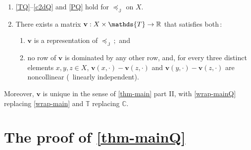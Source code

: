 \documentclass[12pt,a4paper,twoside]{article}
\newcommand{\gsii}{$\textup{GS03}$}
\newcommand{\preceqb}{\mathbin{\preceq}}
\newcommand{\countof}{\mathbin{\#}\hskip1pt}
\newcommand{\ext}{\mathrel{\mc R}}
\newcommand{\sext}{\mathrel{\mc P}}
\newcommand{\next}{\mathrel{\mc I}}
\newcommand{\sextb}{\mathbin{\mc P}}
\newcommand{\mbbc}{{\mathds C}}
\newcommand{\mbbt}{{\mathds {T}}}
\newcommand{\mbbj}{\mathds J}
\newcommand{\xy}{{(x, y)}}
\begin{document}
\begin{appendices}
\begin{theorem}
\begin{enumerate}[label=\textup{(\ref{thm-mainQ}.\roman*)}]

\item\label{ax-mainQ}

 \ref{TQ}--\ref{c2dQ} and
 \ref{PQ} hold for   $\preceqb _ { \mbbj }$ on $X$.
 
    
\item\label{wrap-mainQ} There exists a matrix
  $\mathbf{v} : X \times \mbbt \rightarrow \R$ that satisfies both$\,:$
  \begin{enumerate}[label=\textup{(\ref{thm-mainQ}.\alph*)}]
  \item\label{rep-mainQ}
  $\mathbf{v}$ is a representation of $\preceq _ { \mbbj }\,;$ and

\item\label{rows-mainQ} no row of
  $\mathbf{v}$ is dominated by any other row, and, for every three distinct elements
  $x,y, z \in X$, $\mathbf{v}(x,\cdot)-\mathbf{v}(z,\cdot)
 $ and $\mathbf{v}(y,\cdot)-\mathbf{v}(z,\cdot)$ are noncollinear (\ie\ linearly independent).
\end{enumerate}
\end{enumerate}
Moreover, $\mathbf{v}$ is unique in the sense of \cref{thm-main} part II, with
\ref{wrap-mainQ} replacing \ref{wrap-main} and $\mbbt$ replacing $\mbbc$.
\end{theorem}


\section{The proof of \cref{thm-mainQ}}\label{sec-proof-mainQ} 




\end{appendices}
\end{document}
